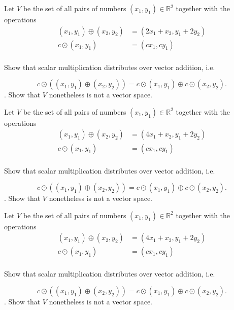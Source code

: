 \documentclass{article}
\begin{document}

\begin{exerciseStatement}
    Let \(V\) be the set of all pairs of numbers \((x_1,y_1)\in\mathbb{R}^2\)  together with the operations
\begin{align*}
(x_1,y_1)\oplus (x_2,y_2)&= (2x_1+x_2, y_1+2y_2)\\
c \odot (x_1,y_1) &= (cx_1,cy_1)\\
\end{align*}

Show that scalar multiplication distributes over vector addition, i.e.

\[c\odot \left((x_1,y_1)\oplus(x_2,y_2)\right)=c\odot(x_1,y_1)\oplus c\odot(x_2,y_2).\]
.
Show that \(V\) nonetheless is not a vector space.



  
\end{exerciseStatement}

\begin{exerciseStatement}
    Let \(V\) be the set of all pairs of numbers \((x_1,y_1)\in\mathbb{R}^2\)  together with the operations
\begin{align*}
(x_1,y_1)\oplus (x_2,y_2)&= (4x_1+x_2, y_1+2y_2)\\
c \odot (x_1,y_1) &= (cx_1,cy_1)\\
\end{align*}

Show that scalar multiplication distributes over vector addition, i.e.

\[c\odot \left((x_1,y_1)\oplus(x_2,y_2)\right)=c\odot(x_1,y_1)\oplus c\odot(x_2,y_2).\]
.
Show that \(V\) nonetheless is not a vector space.



  
\end{exerciseStatement}

\begin{exerciseStatement}
    Let \(V\) be the set of all pairs of numbers \((x_1,y_1)\in\mathbb{R}^2\)  together with the operations
\begin{align*}
(x_1,y_1)\oplus (x_2,y_2)&= (4x_1+x_2, y_1+2y_2)\\
c \odot (x_1,y_1) &= (cx_1,cy_1)\\
\end{align*}

Show that scalar multiplication distributes over vector addition, i.e.

\[c\odot \left((x_1,y_1)\oplus(x_2,y_2)\right)=c\odot(x_1,y_1)\oplus c\odot(x_2,y_2).\]
.
Show that \(V\) nonetheless is not a vector space.



  
\end{exerciseStatement}
\end{document}
